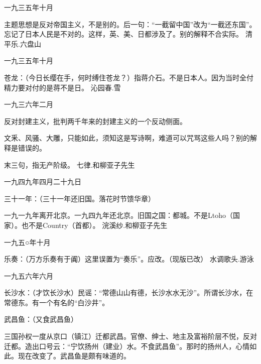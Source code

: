一九三五年十月

主题思想是反对帝国主义，不是别的。后一句：“一截留中国”改为“一截还东国”。忘记了日本人民是不对的。这样，英、美、日都涉及了。别的解释不合实际。
清平乐.六盘山

一九三五年十月

苍龙：（今日长缨在手，何时缚住苍龙？）指蒋介石。不是日本人。因为当时全付精力要对付的是蒋不是日。
沁园春.雪

一九三六年二月

反对封建主义，批判两千年来的封建主义的一个反动侧面。

文釆、风骚、大雕，只能如此，须知这是写诗啊，难道可以咒骂这些人吗？别的解释是错误的。

末三句，指无产阶级。
七律.和柳亚子先生

一九四九年四月二十九日

三十一年：（三十一年还旧国。落花时节馈华章）

一九一九年离开北京。一九四九年还北京。旧国之国：都城。不是Ltoho（国家）。也不是Country（首都）。
浣溪纱.和柳亚子先生

一九五○年十月

乐奏：（万方乐奏有于阗）这里误置为“奏乐”。应改。（现版已改）
水调歌头.游泳

一九五六年六月

长沙水：（才饮长沙水）民谣：“常德山山有德，长沙水水无沙”。所谓长沙水，在常德东。有一个有名的“白沙井”。

武昌鱼：（又食武昌鱼）

三国孙权一度从京口（镇江）迁都武昌。官僚、绅士、地主及富裕阶层不悦，反对迁都。造出口号云：“宁饮扬州（建业）水。不食武昌鱼”。那时的扬州人，心情如此。现在改变了。武昌鱼是颇有味道的。


